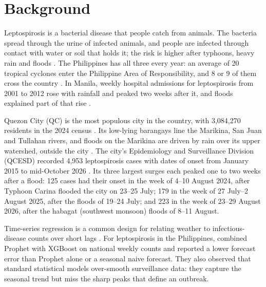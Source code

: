 \section{Background}\label{sec:background}

Leptospirosis is a bacterial disease that people catch from animals. The bacteria spread
through the urine of infected animals, and people are infected through contact with water or
soil that holds it; the risk is higher after typhoons, heavy rain and floods
\parencite{cdc2026}. The Philippines has all three every year: an average of 20 tropical
cyclones enter the Philippine Area of Responsibility, and 8 or 9 of them cross the country
\parencite{pagasa_nd}. In Manila, weekly hospital admissions for leptospirosis from 2001 to
2012 rose with rainfall and peaked two weeks after it, and floods explained part of that rise
\parencite{matsushita2018}.

Quezon City (QC) is the most populous city in the country, with 3,084,270 residents in the
2024 census \parencite{psa_census2024}. Its low-lying barangays line the Marikina, San Juan
and Tullahan rivers, and floods on the Marikina are driven by rain over its upper watershed,
outside the city \parencite{abon2011}. The city's Epidemiology and Surveillance Division
(QCESD) recorded 4,953 leptospirosis cases with dates of onset from January 2015 to
mid-October 2026 \parencite{qcesd2026}. Its three largest surges each peaked one to two weeks
after a flood: 125 cases had their onset in the week of 4--10 August 2024, after Typhoon Carina
flooded the city on 23--25 July; 179 in the week of 27 July--2 August 2025, after the floods of
19--24 July; and 223 in the week of 23--29 August 2026, after the habagat (southwest monsoon)
floods of 8--11 August.

Time-series regression is a common design for relating weather to infectious-disease counts
over short lags \parencite{imai2015}. For leptospirosis in the Philippines,
\textcite{latigay2026} combined Prophet with XGBoost on national weekly counts
\parencite{parreno2023} and reported a lower forecast error than Prophet alone or a seasonal
naive forecast. They also observed that standard statistical models over-smooth surveillance
data: they capture the seasonal trend but miss the sharp peaks that define an outbreak.

